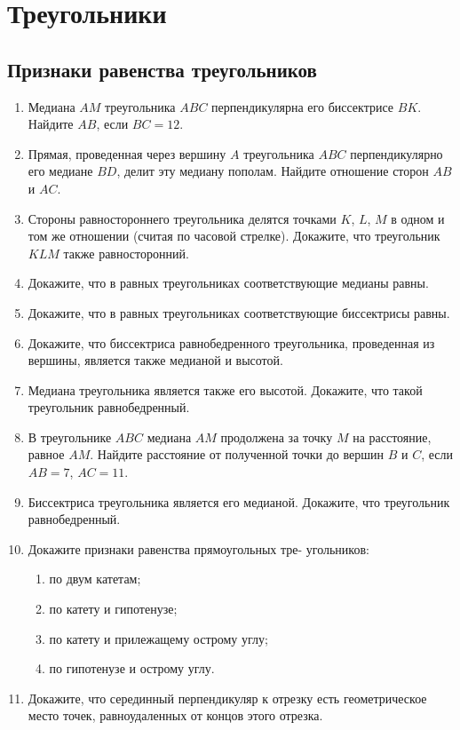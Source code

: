 \documentclass[10pt, a4paper]{article}
\begin{document}
\section{Треугольники}
\subsection{Признаки равенства треугольников}
	\begin{enumerate}
		\item Медиана $AM$ треугольника $ABC$ перпендикулярна его биссектрисе $BK$. Найдите $AB$, если $BC = 12$.
		\item Прямая,  проведенная  через  вершину  $A$  треугольника $ABC$ перпендикулярно его медиане $BD$, 
		делит эту медиану пополам. Найдите отношение сторон $AB$ и $AC$.
		\item Стороны  равностороннего  треугольника  делятся  точками $K$, $L$, $M$ в одном и том же отношении (считая по часовой стрелке).  Докажите,  что  треугольник $KLM$  также  равносторонний.
		\item Докажите, что в равных треугольниках соответствующие медианы равны.
		\item Докажите, что в равных треугольниках соответствующие биссектрисы равны.
		\item Докажите, что биссектриса равнобедренного треугольника, проведенная из вершины, является также медианой
		и высотой.
		\item Медиана треугольника является также его высотой. Докажите, что такой треугольник равнобедренный.
		\item В треугольнике $ABC$ медиана $AM$ продолжена за точку $M$ на расстояние, равное $AM$. Найдите расстояние от полученной точки до вершин $B$ и $C$, если $AB = 7$, $AC = 11$.
		\item Биссектриса треугольника является его медианой. Докажите, что треугольник равнобедренный.
		\item Докажите признаки равенства прямоугольных тре-
		угольников:
		\begin{enumerate}[label=\asbuk*)]
			\item по двум катетам;
			\item по катету и гипотенузе;
			\item по катету и прилежащему острому углу;
			\item по гипотенузе и острому углу.
		\end{enumerate}
		\item Докажите, что серединный перпендикуляр к отрезку есть геометрическое место точек, равноудаленных от концов этого отрезка.

\end{enumerate}
\end{document}
